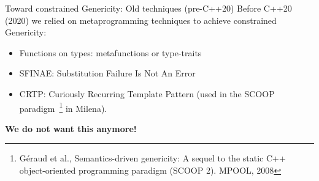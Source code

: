 \documentclass[12pt,aspectratio=169]{beamer}
\begin{document}
\begin{frame}[fragile]{Toward constrained Genericity: Old techniques (pre-C++20)}
  Before C++20 (2020) we relied on metaprogramming techniques to achieve constrained Genericity:
  \vspace{-0.2cm}\begin{itemize}
    \item Functions on types: metafunctions or type-traits
    \item SFINAE: Substitution Failure Is Not An Error
    \item CRTP: Curiously Recurring Template Pattern (used in the SCOOP paradigm~\footnote{G\'{e}raud et al.,
          Semantics-driven genericity: A sequel to the static C++ object-oriented programming paradigm (SCOOP 2). MPOOL,
          2008} in Milena).
  \end{itemize}
  \vspace{-0.3cm}
  \begin{center}\textbf{We do not want this anymore!}\end{center}
\end{frame}

\end{document}
